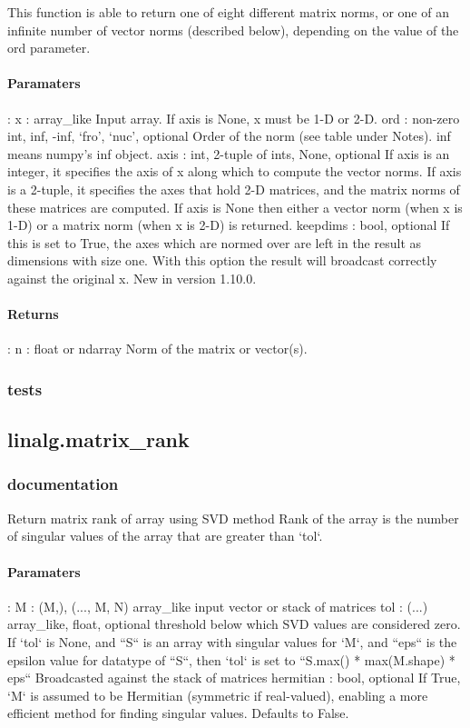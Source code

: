 \documentclass[a4paper,11pt]{article}
\begin{document}
This function is able to return one of eight different matrix norms, or one of an infinite number of vector norms (described below), depending on the value of the ord parameter.\\

\paragraph{Paramaters}: 
x : array\_like
Input array. If axis is None, x must be 1-D or 2-D.
ord : {non-zero int, inf, -inf, ‘fro’, ‘nuc’}, optional
Order of the norm (see table under Notes). inf means numpy’s inf object.
axis : {int, 2-tuple of ints, None}, optional
If axis is an integer, it specifies the axis of x along which to compute the vector norms. If axis is a 2-tuple, it specifies the axes that hold 2-D matrices, and the matrix norms of these matrices are computed. If axis is None then either a vector norm (when x is 1-D) or a matrix norm (when x is 2-D) is returned.
keepdims : bool, optional
If this is set to True, the axes which are normed over are left in the result as dimensions with size one. With this option the result will broadcast correctly against the original x.
New in version 1.10.0.\\

\paragraph{Returns}:    
n : float or ndarray
Norm of the matrix or vector(s).\\

\subsubsection{tests}


\subsection{linalg.matrix\_rank}
\subsubsection{documentation}
Return matrix rank of array using SVD method
Rank of the array is the number of singular values of the array that are
greater than `tol`.
\paragraph{Paramaters}:  M : {(M,), (..., M, N)} array\_like input vector or stack of matrices
tol : (...) array\_like, float, optional
threshold below which SVD values are considered zero. If `tol` is None, and ``S`` is an array with singular values for `M`, and ``eps`` is the epsilon value for datatype of ``S``, then `tol` is set to ``S.max() * max(M.shape) * eps`` Broadcasted against the stack of matrices hermitian : bool, optional If True, `M` is assumed to be Hermitian (symmetric if real-valued),
enabling a more efficient method for finding singular values. Defaults to False.
\end{document}
